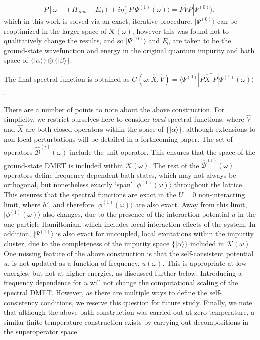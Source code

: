\documentclass[aps,twocolumn,nobibnotes]{revtex4}
\begin{document}
\begin{inparaenum}
\begin{equation}
    P \left[ \omega - (H_{\mathrm emb}-E_0) + i \eta \right] P | \Psi^{(1)}(\omega) \rangle = P {\hat V} P |\Psi^{(0)} \rangle   ,   \label{eqn:ExactResponse}
\end{equation}
which in this work is solved via an exact, iterative procedure\cite{Langou2005}.
$|\Psi^{(0)} \rangle$ can be reoptimized in the larger space of $\mathcal{K}(\omega)$, however this was found not to qualitatively change the results, and 
so $|\Psi^{(0)}\rangle$ and $E_0$ are taken to be the ground-state wavefunction and energy in the 
original quantum impurity and bath space of $\{ | \alpha \rangle \} \otimes \{ | \beta \rangle \}$.
\item The final spectral function is obtained as $G(\omega; \hat{X}, \hat{V}) = \langle \Psi^{(0)} | P \hat{X}^{\dagger} P | \Psi^{(1)}(\omega) \rangle$.
\end{inparaenum}

There are a number of points to note about the above construction. For simplicity, we restrict ourselves here to consider {\em local} spectral functions, where
${\hat V}$ and ${\hat X}$ are both closed operators within the space of $\{|\alpha \rangle \}$, although extensions to non-local perturbations will be detailed in a forthcoming paper.
The set of operators ${\hat {\mathcal{B}}}^{(i)}(\omega)$ include the unit operator.
This ensures that
the space of the ground-state DMET is included within $\mathcal{K}(\omega)$. The rest of the ${\hat {\mathcal{B}}}^{(i)}(\omega)$ operators define frequency-dependent
bath states, which may not always be orthogonal, but nonetheless exactly `span' $|\phi^{(1)}(\omega) \rangle$ throughout the lattice. This ensures that the spectral functions are exact in 
the $U=0$ non-interacting limit, where $h'$, and therefore $|\phi^{(1)}(\omega) \rangle$ are also exact. Away from this limit, 
$|\phi^{(1)}(\omega) \rangle$ also changes, due to the presence of the interaction potential $u$ in the one-particle Hamiltonian, which 
includes local interaction effects of the system.
In addition, $|\Psi^{(1)} \rangle $ is also exact for uncoupled, local excitations within the impurity cluster, due
to the completeness of the impurity space $\{ |\alpha \rangle \}$ included in $\mathcal{K}(\omega)$.
One missing feature of the above construction is that the self-consistent potential $u$, is not updated as a function
of frequency, $u(\omega)$. This is appropriate at low energies, but not at higher 
energies, as discussed further below. Introducing a frequency dependence for $u$ will not change the computational 
scaling of the spectral DMET.  However, as there are multiple ways to define the self-consistency conditions, 
we reserve this question for future study.
Finally, we note that although the above bath construction was carried out at zero temperature, a similar finite temperature construction exists by carrying 
out decompositions in the superoperator space.
\end{document}
